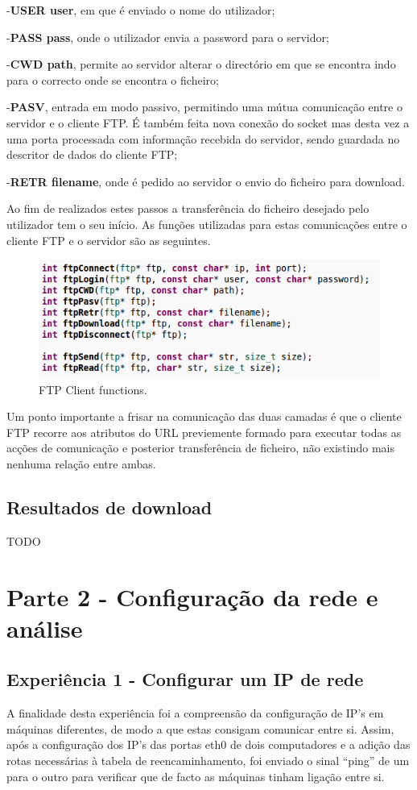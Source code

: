 \documentclass[a4paper]{article}
\begin{document}
 -\textbf{USER user}, em que é enviado o nome do utilizador;
 
 -\textbf{PASS pass}, onde o utilizador envia a password para o servidor;
 
 -\textbf{CWD path}, permite ao servidor alterar o directório em que se encontra indo para o correcto onde se encontra o ficheiro;
 
 -\textbf{PASV}, entrada em modo passivo, permitindo uma mútua comunicação entre o servidor e o cliente FTP. É também feita nova conexão do socket mas desta vez a uma porta processada com informação recebida do servidor, sendo guardada no descritor de dados do cliente FTP;
 
 -\textbf{RETR filename}, onde é pedido ao servidor o envio do ficheiro para download.
 
Ao fim de realizados estes passos a transferência do ficheiro desejado pelo utilizador tem o seu início. As funções utilizadas para estas comunicações entre o cliente FTP e o servidor são as seguintes.

\begin{figure}[h!]
\centering
\includegraphics[scale=0.5]{res/ftp-functions.png}
\caption{FTP Client functions.}
\end{figure}

Um ponto importante a frisar na comunicação das duas camadas é que o cliente FTP recorre aos atributos do URL previemente formado para executar todas as acções de comunicação e posterior transferência de ficheiro, não existindo mais nenhuma relação entre ambas.

\subsection{Resultados de download}
TODO

\section{Parte 2 - Configuração da rede e análise}
\subsection{Experiência 1 - Configurar um IP de rede}
A finalidade desta experiência foi a compreensão da configuração de IP’s em máquinas diferentes, de modo a que estas consigam comunicar entre si. Assim, após a configuração dos IP’s das portas eth0 de dois computadores e a adição das rotas necessárias à tabela de reencaminhamento, foi enviado o sinal “ping” de um para o outro para verificar que de facto as máquinas tinham ligação entre si.
\end{document}
